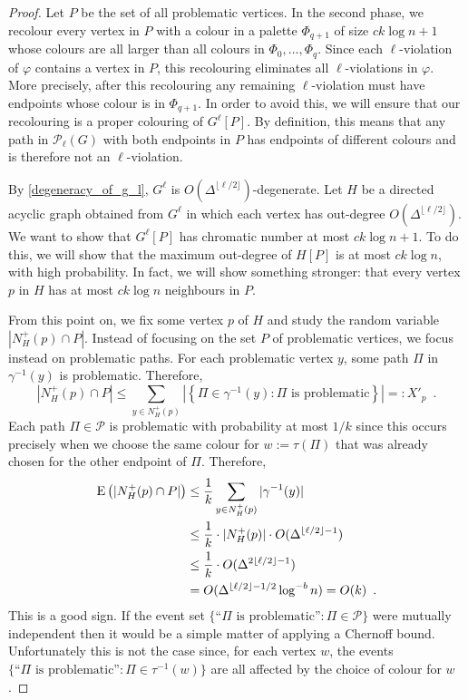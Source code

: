 \documentclass{patmorin}
\begin{document}
\begin{proof}
  Let $P$ be the set of all problematic vertices.
  In the second phase, we recolour every vertex in $P$ with a colour in a palette $\Phi_{q+1}$ of size $ck\log n + 1$ whose colours are all larger than all colours in $\Phi_0,\ldots,\Phi_q$.  Since each $\ell$-violation of $\varphi$ contains a vertex in $P$, this recolouring eliminates all $\ell$-violations in $\varphi$.  More precisely, after this recolouring any remaining $\ell$-violation must have endpoints whose colour is in $\Phi_{q+1}$.  In order to avoid this, we will ensure that our recolouring is a proper colouring of $G^\ell[P]$.  By definition, this means that any path in $\mathcal{P}_\ell(G)$ with both endpoints in $P$ has endpoints of different colours and is therefore not an $\ell$-violation.

  By \cref{degeneracy_of_g_l}, $G^\ell$ is $O(\Delta^{\lfloor\ell /2\rfloor})$-degenerate.  Let $H$ be a directed acyclic graph obtained from $G^{\ell}$ in which each vertex has out-degree $O(\Delta^{\lfloor\ell /2\rfloor})$.
  We want to show that $G^\ell[P]$ has chromatic number at most $ck\log n+1$.  To do this, we will show that the maximum out-degree of $H[P]$ is at most $ck\log n$, with high probability.  In fact, we will show something stronger: that every vertex $p$ in $H$ has at most $ck\log n$ neighbours in $P$.

  From this point on, we fix some vertex $p$ of $H$ and study the random variable $|N_H^+(p)\cap P|$.  Instead of focusing on the set $P$ of problematic vertices, we focus instead on problematic paths.  For each problematic vertex $y$, some path $\Pi$ in $\gamma^{-1}(y)$ is problematic. Therefore,
  \begin{equation}
    |N^+_H(p)\cap P| \le \sum_{y\in N^+_H(p)} \left|\left\{\Pi\in\gamma^{-1}(y): \text{$\Pi$ is problematic}\right\}\right| =: X'_{p} \enspace .
    \label{path_upper_bound}
  \end{equation}
  Each path $\Pi\in\mathcal{P}$ is problematic with probability at most $1/k$ since this occurs precisely when we choose the same colour for $w:=\tau(\Pi)$ that was already chosen for the other endpoint of $\Pi$.  Therefore,
  \begin{align*}
    \mathrm{E}\left(|N^+_H(p)\cap P|\right)
    & \le \frac{1}{k}\sum_{y\in N^+_H(p)}|\gamma^{-1}(y)| \\
    & \le \frac{1}{k}\cdot|N^+_H(p)|\cdot O(\Delta^{\lfloor\ell /2\rfloor-1}) \\
    & \le \frac{1}{k}\cdot O(\Delta^{2\lfloor\ell /2\rfloor-1}) \\
    & = O(\Delta^{\lfloor\ell /2\rfloor-1/2}\log^{-b} n) = O(k) \enspace .
  \end{align*}
  This is a good sign. If the event set $\{\text{``$\Pi$ is problematic''}:\Pi\in\mathcal{P}\}$ were mutually independent then it would be a simple matter of applying a Chernoff bound.  Unfortunately this is not the case since, for each vertex $w$, the events $\{\text{``$\Pi$ is problematic''}:\Pi\in\tau^{-1}(w)\}$ are all affected by the choice of colour for $w$.


\end{proof}
\end{document}
